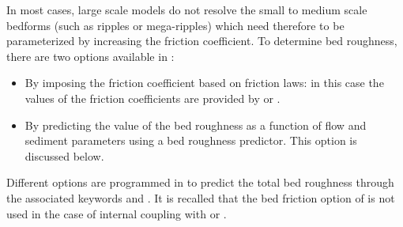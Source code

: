 In most cases, large scale models do not resolve the small to medium
scale bedforms (such as ripples or mega-ripples) which need therefore to be parameterized by increasing the friction coefficient. To determine bed roughness, there are two options available in \sisyphe{}:
\begin{itemize}
\item By imposing the friction coefficient based on friction laws: in this case the values of the friction coefficients are provided by  or .
\item By predicting the value of the bed roughness as a function of flow and sediment parameters using a bed roughness predictor. This option is discussed below.
\end{itemize}
Different options are programmed in \sisyphe to predict the total bed
roughness through the associated keywords  and . It is recalled that the bed friction option of \sisyphe is not
used in the case of internal coupling with  or .
